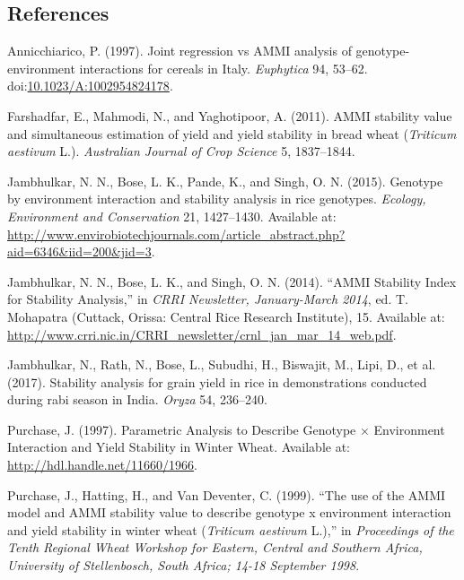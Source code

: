\documentclass[]{article}
\begin{document}
\hypertarget{references}{%
\subsection*{References}\label{references}}

\hypertarget{refs}{}
\leavevmode\hypertarget{ref-annicchiarico_joint_1997}{}%
Annicchiarico, P. (1997). Joint regression vs AMMI analysis of
genotype-environment interactions for cereals in Italy. \emph{Euphytica}
94, 53--62.
doi:\href{https://doi.org/10.1023/A:1002954824178}{10.1023/A:1002954824178}.

\leavevmode\hypertarget{ref-farshadfar_ammi_2011}{}%
Farshadfar, E., Mahmodi, N., and Yaghotipoor, A. (2011). AMMI stability
value and simultaneous estimation of yield and yield stability in bread
wheat (\emph{Triticum aestivum} L.). \emph{Australian Journal of Crop
Science} 5, 1837--1844.

\leavevmode\hypertarget{ref-jambhulkar_genotype_2015}{}%
Jambhulkar, N. N., Bose, L. K., Pande, K., and Singh, O. N. (2015).
Genotype by environment interaction and stability analysis in rice
genotypes. \emph{Ecology, Environment and Conservation} 21, 1427--1430.
Available at:
\url{http://www.envirobiotechjournals.com/article_abstract.php?aid=6346\&iid=200\&jid=3}.

\leavevmode\hypertarget{ref-jambhulkar_ammi_2014}{}%
Jambhulkar, N. N., Bose, L. K., and Singh, O. N. (2014). ``AMMI
Stability Index for Stability Analysis,'' in \emph{CRRI Newsletter,
January-March 2014}, ed. T. Mohapatra (Cuttack, Orissa: Central Rice
Research Institute), 15. Available at:
\url{http://www.crri.nic.in/CRRI_newsletter/crnl_jan_mar_14_web.pdf}.

\leavevmode\hypertarget{ref-jambhulkar_stability_2017}{}%
Jambhulkar, N., Rath, N., Bose, L., Subudhi, H., Biswajit, M., Lipi, D.,
et al. (2017). Stability analysis for grain yield in rice in
demonstrations conducted during rabi season in India. \emph{Oryza} 54,
236--240.

\leavevmode\hypertarget{ref-purchase_parametric_1997}{}%
Purchase, J. (1997). Parametric Analysis to Describe Genotype ×
Environment Interaction and Yield Stability in Winter Wheat. Available
at: \url{http://hdl.handle.net/11660/1966}.

\leavevmode\hypertarget{ref-purchase_use_1999}{}%
Purchase, J., Hatting, H., and Van Deventer, C. (1999). ``The use of the
AMMI model and AMMI stability value to describe genotype x environment
interaction and yield stability in winter wheat (\emph{Triticum
aestivum} L.),'' in \emph{Proceedings of the Tenth Regional Wheat
Workshop for Eastern, Central and Southern Africa, University of
Stellenbosch, South Africa; 14-18 September 1998}.
\end{document}
